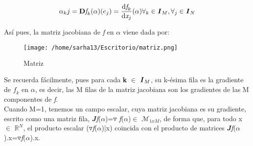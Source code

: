 \documentclass[letter,openrigh,12pt,spanish]{report}
\begin{document}
\begin{displaymath}
\alpha_kj=\textbf{D}\textit{f}_k(\alpha)(e_j)= \frac{\mathrm{d}\textit{f}_k}{\mathrm{d}\textit{x}_j}(\alpha)  \forall_k \in \textbf{\textit{I}}_M, \forall_j\in\textbf{\textit{I}}_N
\end{displaymath}

As\'i pues, la matriz jacobiana de \textit{f} en $\alpha$ viene dada por:\\

\begin{figure}[htp]
\centering
\texttt{[image: /home/sarha13/Escritorio/matriz.png]}
\caption{Matriz}
\label{Figura}
\end{figure}

Se recuerda f\'acilmente, pues para cada \textbf{k} $\in$ $\textbf{\textit{I}}_M$, su k-\'esima fila es la gradiente de $\textit{f}_k$ en $\alpha$, es decir, las M filas de la matriz jacobiana son los gradientes de las M componentes de \textit{f}.\\
Cuando M=1, tenemos un campo escalar, cuya matriz jacobiana es su gradiente, escrito como una matriz fila, \textbf{\textit{J}}\textit{f}($\alpha$)=$\triangledown$ \textit{f}($\alpha$)$\in$ $\mathcal{M}_{1xM}$, de forma que, para todo x $\in$ $\mathbb{R}^N$, el producto escalar ($\triangledown$\textit{f}($\alpha$)|x) coincida con el producto de matrices \textbf{\textit{J}}\textit{f}($\alpha$).x=$\triangledown$\textit{f}($\alpha$).x. 
\end{document}
